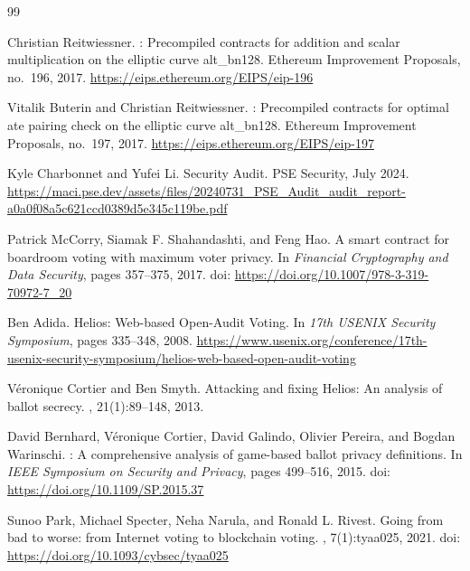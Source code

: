 \documentclass[11pt]{article}
\begin{document}
\begin{thebibliography}{99}\small

Christian Reitwiessner.
: Precompiled contracts for addition and scalar multiplication on the elliptic curve alt\_bn128.
\newblock Ethereum Improvement Proposals, no.~196, 2017.
\newblock \url{https://eips.ethereum.org/EIPS/eip-196}

Vitalik Buterin and Christian Reitwiessner.
: Precompiled contracts for optimal ate pairing check on the elliptic curve alt\_bn128.
\newblock Ethereum Improvement Proposals, no.~197, 2017.
\newblock \url{https://eips.ethereum.org/EIPS/eip-197}

Kyle Charbonnet and Yufei Li.
 Security Audit.
\newblock PSE Security, July 2024.
\newblock \url{https://maci.pse.dev/assets/files/20240731_PSE_Audit_audit_report-a0a0f08a5c621ccd0389d5e345c119be.pdf}

Patrick McCorry, Siamak F. Shahandashti, and Feng Hao.
\newblock A smart contract for boardroom voting with maximum voter privacy.
\newblock In {\em Financial Cryptography and Data Security}, pages 357--375, 2017.
\newblock doi: \url{https://doi.org/10.1007/978-3-319-70972-7_20}

Ben Adida.
\newblock Helios: Web-based Open-Audit Voting.
\newblock In {\em 17th USENIX Security Symposium}, pages 335--348, 2008.
\newblock \url{https://www.usenix.org/conference/17th-usenix-security-symposium/helios-web-based-open-audit-voting}

V{\'e}ronique Cortier and Ben Smyth.
\newblock Attacking and fixing Helios: An analysis of ballot secrecy.
, 21(1):89--148, 2013.

David Bernhard, V{\'e}ronique Cortier, David Galindo, Olivier Pereira, and Bogdan Warinschi.
: A comprehensive analysis of game-based ballot privacy definitions.
\newblock In {\em IEEE Symposium on Security and Privacy}, pages 499--516, 2015.
\newblock doi: \url{https://doi.org/10.1109/SP.2015.37}

Sunoo Park, Michael Specter, Neha Narula, and Ronald L. Rivest.
\newblock Going from bad to worse: from Internet voting to blockchain voting.
, 7(1):tyaa025, 2021.
\newblock doi: \url{https://doi.org/10.1093/cybsec/tyaa025}


\end{thebibliography}
\end{document}
